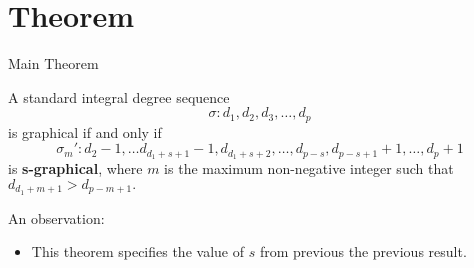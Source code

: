 \section{Theorem}

\begin{frame}{Main Theorem}
	\begin{theorem}
		A standard integral degree sequence 
		\begin{equation}
			\sigma: d_1,d_2,d_3,\ldots, d_p
		\end{equation}
		is graphical if and only if 
		\begin{equation*}
			\sigma_m':d_2-1,\ldots d_{d_1+s+1}-1,d_{d_1+s+2},\ldots, d_{p-s},d_{p-s+1}+1,\ldots,d_p+1
		\end{equation*}
		is \textbf{s-graphical}, where $m$ is the maximum non-negative integer such that $d_{d_1+m+1}>d_{p-m+1}.$
	\end{theorem}
		An observation:
	\begin{itemize}
		\item This theorem specifies the value of $s$ from previous the previous result.
	\end{itemize}
\end{frame}

